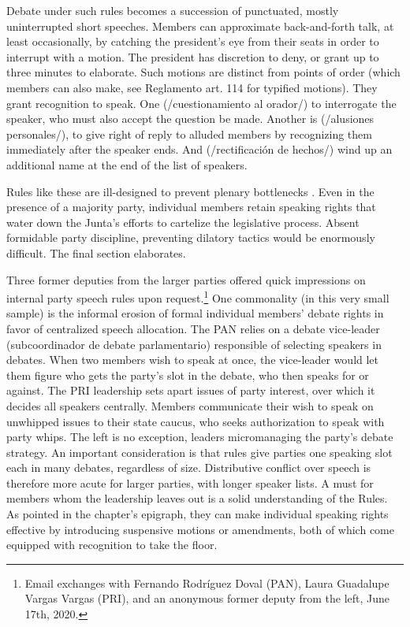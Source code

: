 \documentclass[letter,12pt]{article}
\begin{document}
Debate under such rules becomes a succession of punctuated, mostly uninterrupted short speeches. Members can approximate back-and-forth talk, at least occasionally, by catching the president's eye from their seats in order to interrupt with a motion. The president has discretion to deny, or grant up to three minutes to elaborate. Such motions are distinct from points of order (which members can also make, see Reglamento art. 114 for typified motions). They grant recognition to speak. One (/cuestionamiento al orador/) to interrogate the speaker, who must also accept the question be made. Another is (/alusiones personales/), to give right of reply to alluded members by recognizing them immediately after the speaker ends. And (/rectificación de hechos/) wind up an additional name at the end of the list of speakers. 


Rules like these are ill-designed to prevent plenary bottlenecks \citep{cox.2006}. Even in the presence of a majority party, individual members retain speaking rights that water down the Junta's efforts to cartelize the legislative process. Absent formidable party discipline, preventing dilatory tactics would be enormously difficult. The final section elaborates. 

Three former deputies from the larger parties offered quick impressions on internal party speech rules upon request.\footnote{Email exchanges with Fernando Rodríguez Doval (PAN), Laura Guadalupe Vargas Vargas (PRI), and an anonymous former deputy from the left, June 17th, 2020.} One commonality (in this very small sample) is the informal erosion of formal individual members' debate rights in favor of centralized speech allocation. The PAN relies on a debate vice-leader (subcoordinador de debate parlamentario) responsible of selecting speakers in debates. When two members wish to speak at once, the vice-leader would let them figure who gets the party's slot in the debate, who then speaks for or against. The PRI leadership sets apart issues of party interest, over which it decides all speakers centrally. Members communicate their wish to speak on unwhipped issues to their state caucus, who seeks authorization to speak with party whips. The left is no exception, leaders micromanaging the party's debate strategy. An important consideration is that rules give parties one speaking slot each in many debates, regardless of size. Distributive conflict over speech is therefore more acute for larger parties, with longer speaker lists. A must for members whom the leadership leaves out is a solid understanding of the Rules. As pointed in the chapter's epigraph, they can make individual speaking rights effective by introducing suspensive motions or amendments, both of which come equipped with recognition to take the floor. 
\end{document}

